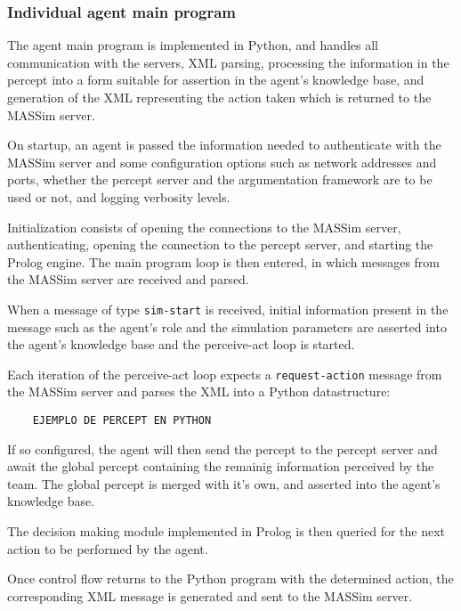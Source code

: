 \subsubsection{Individual agent main program}
    The agent main program is implemented in Python, and handles all
    communication with the servers, XML parsing, processing the information in
    the percept into a form suitable for assertion in the agent's knowledge
    base, and generation of the XML representing the action taken which is
    returned to the MASSim server.

    On startup, an agent is passed the information needed to authenticate with
    the MASSim server and some configuration options such as network addresses
    and ports, whether the percept server and the argumentation framework are to
    be used or not, and logging verbosity levels.

    Initialization consists of opening the connections to the MASSim server,
    authenticating, opening the connection to the percept server, and starting
    the Prolog engine. The main program loop is then entered, in which messages
    from the MASSim server are received and parsed. 

    When a message of type \texttt{sim-start} is received, initial information
    present in the message such as the agent's role and the simulation
    parameters are asserted into the agent's knowledge base and the perceive-act
    loop is started.

    Each iteration of the perceive-act loop expects a \texttt{request-action}
    message from the MASSim server and parses the XML into a Python
    datastructure:

    \begin{verbatim}
    EJEMPLO DE PERCEPT EN PYTHON
    \end{verbatim}
    
    If so configured, the agent will then send the percept to the percept server
    and await the global percept containing the remainig information perceived
    by the team. The global percept is merged with it's own, and asserted into
    the agent's knowledge base.

    The decision making module implemented in Prolog is then queried for the
    next action to be performed by the agent.
    
    Once control flow returns to the Python program with the determined action,
    the corresponding XML message is generated and sent to the MASSim server. 

